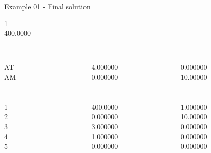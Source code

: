 \begin{frame}{Example 01 - Final solution}

 1\\
  400.0000\\

\begin{columns}[t]
\begin{column}{0.3\textwidth}
\\
AT\\
AM\\
-----------\\
\\
1\\
2\\
3\\
4\\
5\\
\end{column}
\begin{column}{0.3\textwidth}
\\
4.000000\\
0.000000\\
-----------\\
\\
400.0000\\
0.000000\\
3.000000\\
1.000000\\
0.000000\\

\end{column}

\begin{column}{0.3\textwidth}
\\
0.000000\\
10.00000\\
-----------\\
\\
1.000000\\
10.00000\\
0.000000\\
0.000000\\
0.000000\\
\end{column}
\end{columns}

\end{frame}
